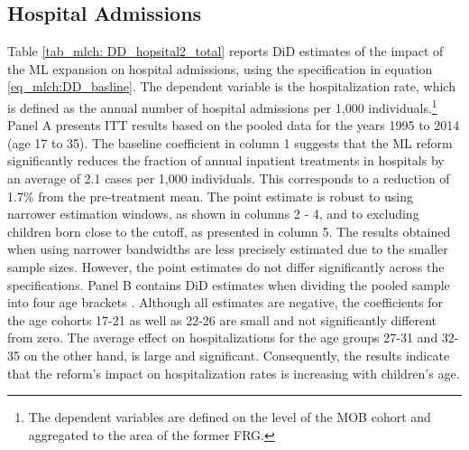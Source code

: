 \subsection{Hospital Admissions}


Table \ref{tab_mlch: DD_hopsital2_total} reports DiD estimates of the impact of the ML expansion on hospital admissions, using the specification in equation \ref{eq_mlch:DD_basline}. The dependent variable is the hospitalization rate, which is defined as the annual number of hospital admissions per 1,000 individuals.\footnote{The dependent variables are defined on the level of the MOB cohort and aggregated to the area of the former FRG.} Panel A presents ITT results based on the pooled data for the years 1995 to 2014 (age 17 to 35). The baseline coefficient in column 1 suggests that the ML reform significantly reduces the fraction of annual inpatient treatments in hospitals by an average of 2.1 cases per 1,000 individuals. This corresponds to a reduction of 1.7\% from the pre-treatment mean. The point estimate is robust to using narrower estimation windows, as shown in columns 2 - 4, and to excluding children born close to the cutoff, as presented in column 5. The results obtained when using narrower bandwidths are less precisely estimated due to the smaller sample sizes. However, the point estimates do not differ significantly across the specifications. Panel B contains DiD estimates when dividing the pooled sample into four age brackets \label{rev_mlch: editor_comprehension_interaction}. Although all estimates are negative, the coefficients for the age cohorts 17-21 as well as 22-26 are small and not significantly different from zero. The average effect on hospitalizations for the age groups 27-31 and 32-35 on the other hand, is large and significant. Consequently, the results indicate that the reform's impact on hospitalization rates is increasing with children's age.





